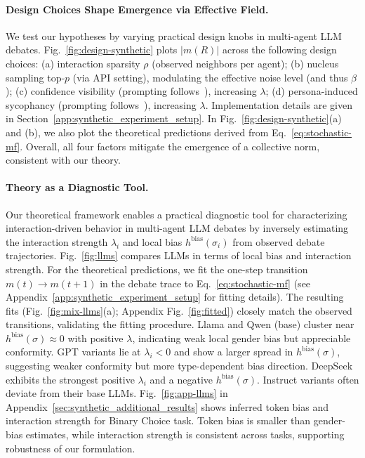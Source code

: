 \documentclass{article}
\theoremstyle{plain}
\theoremstyle{definition}
\theoremstyle{remark}
\begin{document}
\paragraph{Design Choices Shape Emergence via Effective Field.}
We test our hypotheses by varying practical design knobs in multi-agent LLM debates.
Fig.~\ref{fig:design-synthetic} plots \(\lvert m(R)\rvert\) across the following design choices:
(a) interaction sparsity \(\rho\) (observed neighbors per agent);
(b) nucleus sampling top-\(p\) (via API setting), modulating the effective noise level (and thus \(\beta\));
(c) confidence visibility (prompting follows~\cite{eo2025debate}), increasing \(\lambda\);
(d) persona-induced sycophancy (prompting follows~\cite{chen2025persona}), increasing \(\lambda\). 
Implementation details are given in Section~\ref{app:synthetic_experiment_setup}.
In Fig.~\ref{fig:design-synthetic}(a) and (b), we also plot the theoretical predictions derived from Eq.~\eqref{eq:stochastic-mf}.
Overall, all four factors mitigate the emergence of a collective norm, consistent with our theory. 


\paragraph{Theory as a Diagnostic Tool. }
Our theoretical framework enables a practical diagnostic tool for characterizing interaction-driven behavior in multi-agent LLM debates by inversely estimating the interaction strength $\lambda_i$ and local bias $h^{\textrm{bias}}(\sigma_i)$ from observed debate trajectories. 
Fig.~\ref{fig:llms} compares LLMs in terms of local bias and interaction strength. 
For the theoretical predictions, we fit the one-step transition $m(t)\!\to\! m(t{+}1)$ in the debate trace to Eq.~\eqref{eq:stochastic-mf} (see Appendix~\ref{app:synthetic_experiment_setup} for fitting details). 
The resulting fits (Fig.~\ref{fig:mix-llms}(a); Appendix Fig.~\ref{fig:fitted}) closely match the observed transitions, validating the fitting procedure. 
Llama and Qwen (base) cluster near $h^{\textrm{bias}}(\sigma) \approx 0$ with positive $\lambda$, indicating weak local gender bias but appreciable conformity.
GPT variants lie at $\lambda_i<0$ and show a larger spread in $h^{\textrm{bias}}(\sigma)$, suggesting weaker conformity but more type-dependent bias direction.
DeepSeek exhibits the strongest positive $\lambda_i$ and a negative $h^{\textrm{bias}}(\sigma)$. 
Instruct variants often deviate from their base LLMs. 
Fig.~\ref{fig:app-llms} in Appendix~\ref{sec:synthetic_additional_results} shows inferred token bias and interaction strength for Binary Choice task. Token bias is smaller than gender-bias estimates, while interaction strength is consistent across tasks, supporting robustness of our formulation. 
\end{document}
